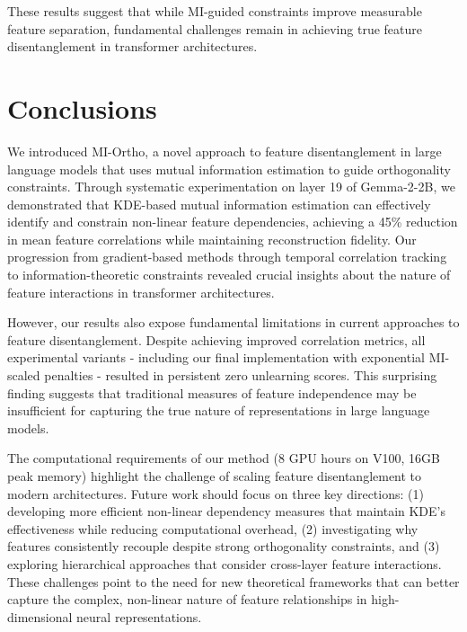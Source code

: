 \documentclass{article} %
\begin{document}
These results suggest that while MI-guided constraints improve measurable feature separation, fundamental challenges remain in achieving true feature disentanglement in transformer architectures.

\section{Conclusions}
\label{sec:conclusion}

We introduced MI-Ortho, a novel approach to feature disentanglement in large language models that uses mutual information estimation to guide orthogonality constraints. Through systematic experimentation on layer 19 of Gemma-2-2B, we demonstrated that KDE-based mutual information estimation can effectively identify and constrain non-linear feature dependencies, achieving a 45\% reduction in mean feature correlations while maintaining reconstruction fidelity. Our progression from gradient-based methods through temporal correlation tracking to information-theoretic constraints revealed crucial insights about the nature of feature interactions in transformer architectures.

However, our results also expose fundamental limitations in current approaches to feature disentanglement. Despite achieving improved correlation metrics, all experimental variants - including our final implementation with exponential MI-scaled penalties - resulted in persistent zero unlearning scores. This surprising finding suggests that traditional measures of feature independence may be insufficient for capturing the true nature of representations in large language models.

The computational requirements of our method (8 GPU hours on V100, 16GB peak memory) highlight the challenge of scaling feature disentanglement to modern architectures. Future work should focus on three key directions: (1) developing more efficient non-linear dependency measures that maintain KDE's effectiveness while reducing computational overhead, (2) investigating why features consistently recouple despite strong orthogonality constraints, and (3) exploring hierarchical approaches that consider cross-layer feature interactions. These challenges point to the need for new theoretical frameworks that can better capture the complex, non-linear nature of feature relationships in high-dimensional neural representations.



\end{document}
